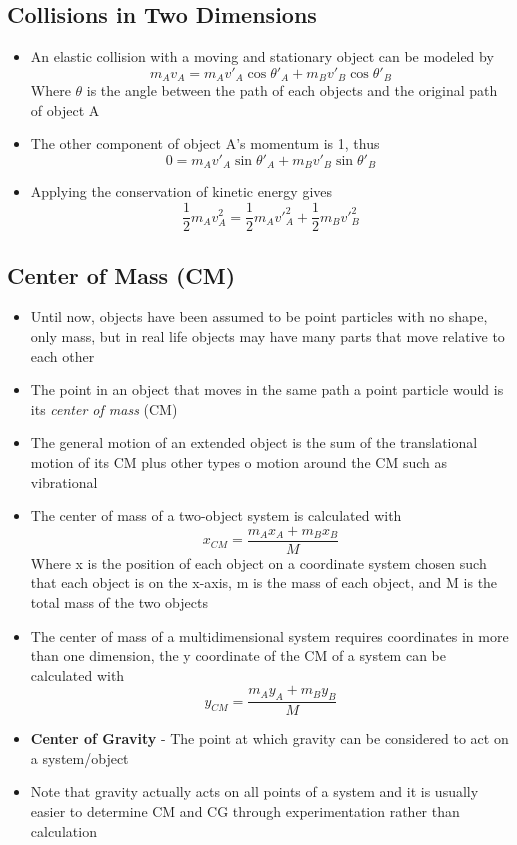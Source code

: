 \subsection{Collisions in Two Dimensions}
\begin{itemize}
    \item An elastic collision with a moving and stationary object can be modeled by \[m_Av_A=m_Av'_A\cos\theta'_A+m_Bv'_B\cos\theta'_B\] Where $\theta$ is the angle between the path of each objects and the original path of object A
    \item The other component of object A's momentum is 1, thus \[0=m_Av'_A\sin\theta'_A+m_Bv'_B\sin\theta'_B\]
    \item Applying the conservation of kinetic energy gives \[\frac{1}{2}m_Av_A^2=\frac{1}{2}m_Av'^2_A+\frac{1}{2}m_Bv'^2_B\]
\end{itemize}

\subsection{Center of Mass (CM)}
\begin{itemize}
    \item Until now, objects have been assumed to be point particles with no shape, only mass, but in real life objects may have many parts that move relative to each other
    \item The point in an object that moves in the same path a point particle would is its \emph{center of mass} (CM)
    \item The general motion of an extended object is the sum of the translational motion of its CM plus other types o motion around the CM such as vibrational
    \item The center of mass of a two-object system is calculated with \[x_{CM}=\frac{m_Ax_A+m_Bx_B}{M}\] Where x is the position of each object on a coordinate system chosen such that each object is on the x-axis, m is the mass of each object, and M is the total mass of the two objects
    \item The center of mass of a multidimensional system requires coordinates in more than one dimension, the y coordinate of the CM of a system can be calculated with \[y_{CM}=\frac{m_Ay_A+m_By_B}{M}\]
    \item \textbf{Center of Gravity} - The point at which gravity can be considered to act on a system/object
    \item Note that gravity actually acts on all points of a system and it is usually easier to determine CM and CG through experimentation rather than calculation
\end{itemize}

